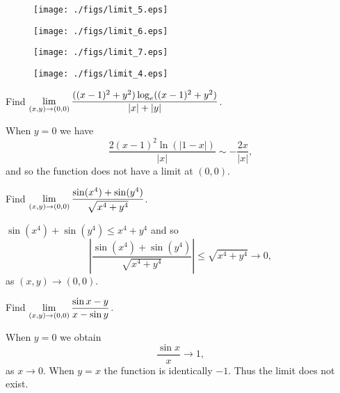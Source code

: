 \begin{figure}[htpb]
\begin{minipage}{8cm}
\texttt{[image: ./figs/limit\_5.eps]}
\vspace*{1cm}\footnotesize{}\label{fig:limits_5}
\end{minipage}\hfill
\begin{minipage}{8cm}
\texttt{[image: ./figs/limit\_6.eps]}
\vspace*{1cm}\footnotesize{}\label{fig:limits_6}
\end{minipage}\hfill
\begin{minipage}{8cm}
\texttt{[image: ./figs/limit\_7.eps]}
\vspace*{1cm}\footnotesize{}\label{fig:limits_7}
\end{minipage}\hfill
\begin{minipage}{8cm}
\texttt{[image: ./figs/limit\_4.eps]}
\vspace*{1cm}\footnotesize{}\label{fig:limits_4}
\end{minipage}
\end{figure}


\begin{exa}\label{exa:limits_5} Find $\displaystyle{\lim\limits_{(x, y)\rightarrow (0,0)}\dfrac{((x - 1)^2 + y^2)\log_e ((x - 1)^2 + y^2)}{|x| +
|y|}}$.
\end{exa}\begin{solu}  When $y = 0$ we have
$$\dfrac{2(x - 1)^2\ln(|1 - x|)}{|x|} \sim -\dfrac{2x}{|x|},$$and so
the function does not have a limit at $(0,0)$.
\end{solu}
\begin{exa}\label{exa:limits_6} Find $\displaystyle{\lim\limits_{(x, y)\rightarrow
(0,0)}\dfrac{\sin (x^4) + \sin (y^4)}{\sqrt{x^4 + y^4}}}$.
\end{exa}\begin{solu}  $\sin (x^4) + \sin (y^4) \leq x^4 + y^4$ and so
$$\left|\dfrac{\sin (x^4) + \sin (y^4)}{\sqrt{x^4 + y^4}}\right| \leq \sqrt{x^4 + y^4} \rightarrow
0,$$as $(x, y)\rightarrow (0,0)$. \end{solu}
\begin{exa}\label{exa:limits_7} Find $\displaystyle{\lim\limits_{(x, y)\rightarrow (0,0)}\dfrac{\sin x - y}{x - \sin y}}$. \end{exa}
\begin{solu}  When $y = 0$ we obtain
$$\dfrac{\sin x}{x} \rightarrow 1,$$as $x \rightarrow 0.$ When $y =
x$ the function is identically $-1$. Thus the limit does not exist.
\end{solu}


